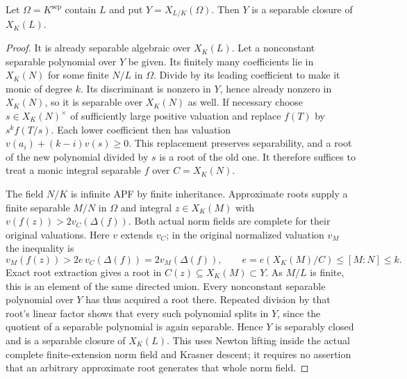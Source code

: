 \begin{lemma}
\label{fw:separable-norm-union-closed}
\leanok
Let $\Omega=K^{\mathrm{sep}}$ contain $L$ and put
$Y=X_{L/K}(\Omega)$. Then $Y$ is a separable closure of $X_K(L)$.
\end{lemma}
\begin{proof}
It is already separable algebraic over $X_K(L)$. Let a nonconstant
separable polynomial over $Y$ be given. Its finitely many coefficients
lie in $X_K(N)$ for some finite $N/L$ in $\Omega$. Divide by its
leading coefficient to make it monic of degree $k$. Its discriminant
is nonzero in $Y$, hence already nonzero in $X_K(N)$, so it is
separable over $X_K(N)$ as well. If necessary
choose $s\in X_K(N)^\times$ of sufficiently large positive valuation
and replace $f(T)$ by $s^k f(T/s)$. Each lower coefficient then has
valuation $v(a_i)+(k-i)v(s)\geq0$. This replacement preserves
separability, and a root of the new polynomial divided by $s$ is a
root of the old one. It therefore suffices to treat a monic integral
separable $f$ over $C=X_K(N)$.

The field $N/K$ is infinite APF by finite inheritance. Approximate
roots supply a finite separable $M/N$ in $\Omega$ and integral
$z\in X_K(M)$ with $v(f(z))>2v_C(\Delta(f))$. Both actual norm
fields are complete for their original valuations. Here $v$ extends
$v_C$; in the original normalized valuation $v_M$ the inequality is
\[
 v_M(f(z))>2e\,v_C(\Delta(f))=2v_M(\Delta(f)),
 \qquad e=e(X_K(M)/C)\leq[M:N]\leq k.
\]
Exact root
extraction gives a root in $C(z)\subseteq X_K(M)\subset Y$.
As $M/L$ is finite, this is an element of the same directed union.
Every nonconstant separable polynomial over $Y$ has thus acquired
a root there. Repeated division by that root's linear factor shows
that every such polynomial splits in $Y$, since the quotient of a
separable polynomial is again separable. Hence $Y$ is separably
closed and is a separable closure of $X_K(L)$.
This uses Newton lifting inside the actual complete finite-extension
norm field and Krasner descent; it requires no assertion that an
arbitrary approximate root generates that whole norm field.
\end{proof}


